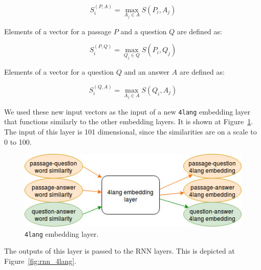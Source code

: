 \[S^{(P, A)}_i = \max_{A_j \in A} S(P_i, A_j)\]

Elements of a vector for a passage $P$ and a question $Q$ are defined as:

\[S^{(P, Q)}_i = \max_{Q_j \in Q} S(P_i, Q_j)\]

Elements of a vector for a question $Q$ and an answer $A$ are defined as:

\[S^{(Q, A)}_i = \max_{A_j \in A} S(Q_i, A_j)\]

We used these new input vectors as the input of a new \texttt{4lang} embedding layer that functions similarly to the other embedding layers. It is shown at Figure~\ref{fig:4lang_embedding}. The input of this layer is 101 dimensional, since the similarities are on a scale to 0 to 100.

\begin{figure}[h!]
	\centering
	\includegraphics[scale=0.5]{4lang_embedding.jpg}
	\caption{\texttt{4lang} embedding layer.}
	\label{fig:4lang_embedding}
\end{figure}

The outputs of this layer is passed to the RNN layers. This is depicted at Figure~\ref{fig:rnn_4lang}.

